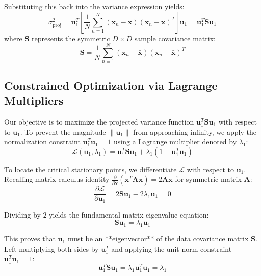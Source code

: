 \documentclass[11pt,a4paper]{article}
\begin{document}
Substituting this back into the variance expression yields:
\begin{equation}
\sigma_{\text{proj}}^2 = \mathbf{u}_1^T \left[ \frac{1}{N}\sum_{n=1}^{N} (\mathbf{x}_n - \mathbf{\bar{x}})(\mathbf{x}_n - \mathbf{\bar{x}})^T \right] \mathbf{u}_1 = \mathbf{u}_1^T \mathbf{S} \mathbf{u}_1
\end{equation}
where $\mathbf{S}$ represents the symmetric $D \times D$ sample covariance matrix:
\begin{equation}
\mathbf{S} = \frac{1}{N}\sum_{n=1}^{N} (\mathbf{x}_n - \mathbf{\bar{x}})(\mathbf{x}_n - \mathbf{\bar{x}})^T
\end{equation}

\subsection{Constrained Optimization via Lagrange Multipliers}
Our objective is to maximize the projected variance function $\mathbf{u}_1^T \mathbf{S} \mathbf{u}_1$ with respect to $\mathbf{u}_1$. To prevent the magnitude $\|\mathbf{u}_1\|$ from approaching infinity, we apply the normalization constraint $\mathbf{u}_1^T \mathbf{u}_1 = 1$ using a Lagrange multiplier denoted by $\lambda_1$:
\begin{equation}
\mathcal{L}(\mathbf{u}_1, \lambda_1) = \mathbf{u}_1^T \mathbf{S} \mathbf{u}_1 + \lambda_1 \left(1 - \mathbf{u}_1^T \mathbf{u}_1\right)
\end{equation}

To locate the critical stationary points, we differentiate $\mathcal{L}$ with respect to $\mathbf{u}_1$. Recalling matrix calculus identity $\frac{\partial}{\partial \mathbf{x}}(\mathbf{x}^T \mathbf{A} \mathbf{x}) = 2\mathbf{A}\mathbf{x}$ for symmetric matrix $\mathbf{A}$:
\begin{equation}
\frac{\partial \mathcal{L}}{\partial \mathbf{u}_1} = 2\mathbf{S}\mathbf{u}_1 - 2\lambda_1 \mathbf{u}_1 = 0
\end{equation}

Dividing by $2$ yields the fundamental matrix eigenvalue equation:
\begin{equation}
\mathbf{S}\mathbf{u}_1 = \lambda_1 \mathbf{u}_1
\end{equation}

This proves that $\mathbf{u}_1$ must be an **eigenvector** of the data covariance matrix $\mathbf{S}$. Left-multiplying both sides by $\mathbf{u}_1^T$ and applying the unit-norm constraint $\mathbf{u}_1^T \mathbf{u}_1 = 1$:
\begin{equation}
\mathbf{u}_1^T \mathbf{S} \mathbf{u}_1 = \lambda_1 \mathbf{u}_1^T \mathbf{u}_1 = \lambda_1
\end{equation}
\end{document}
